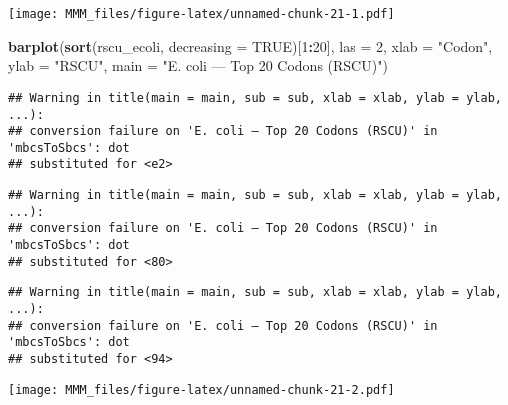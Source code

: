 \documentclass[
]{article}
\newenvironment{Shaded}{\begin{snugshade}}{\end{snugshade}}
\newcommand{\AttributeTok}[1]{\textcolor[rgb]{0.13,0.29,0.53}{#1}}
\newcommand{\ConstantTok}[1]{\textcolor[rgb]{0.56,0.35,0.01}{#1}}
\newcommand{\DecValTok}[1]{\textcolor[rgb]{0.00,0.00,0.81}{#1}}
\newcommand{\FunctionTok}[1]{\textcolor[rgb]{0.13,0.29,0.53}{\textbf{#1}}}
\newcommand{\NormalTok}[1]{#1}
\newcommand{\SpecialCharTok}[1]{\textcolor[rgb]{0.81,0.36,0.00}{\textbf{#1}}}
\newcommand{\StringTok}[1]{\textcolor[rgb]{0.31,0.60,0.02}{#1}}
\begin{document}
\texttt{[image: MMM\_files/figure-latex/unnamed-chunk-21-1.pdf]}

\begin{Shaded}
\begin{Highlighting}[]
\FunctionTok{barplot}\NormalTok{(}\FunctionTok{sort}\NormalTok{(rscu\_ecoli, }\AttributeTok{decreasing =} \ConstantTok{TRUE}\NormalTok{)[}\DecValTok{1}\SpecialCharTok{:}\DecValTok{20}\NormalTok{],}
        \AttributeTok{las =} \DecValTok{2}\NormalTok{, }\AttributeTok{xlab =} \StringTok{"Codon"}\NormalTok{, }\AttributeTok{ylab =} \StringTok{"RSCU"}\NormalTok{,}
        \AttributeTok{main =} \StringTok{"E. coli — Top 20 Codons (RSCU)"}\NormalTok{)}
\end{Highlighting}
\end{Shaded}

\begin{verbatim}
## Warning in title(main = main, sub = sub, xlab = xlab, ylab = ylab, ...):
## conversion failure on 'E. coli — Top 20 Codons (RSCU)' in 'mbcsToSbcs': dot
## substituted for <e2>
\end{verbatim}

\begin{verbatim}
## Warning in title(main = main, sub = sub, xlab = xlab, ylab = ylab, ...):
## conversion failure on 'E. coli — Top 20 Codons (RSCU)' in 'mbcsToSbcs': dot
## substituted for <80>
\end{verbatim}

\begin{verbatim}
## Warning in title(main = main, sub = sub, xlab = xlab, ylab = ylab, ...):
## conversion failure on 'E. coli — Top 20 Codons (RSCU)' in 'mbcsToSbcs': dot
## substituted for <94>
\end{verbatim}

\texttt{[image: MMM\_files/figure-latex/unnamed-chunk-21-2.pdf]}
\end{document}
